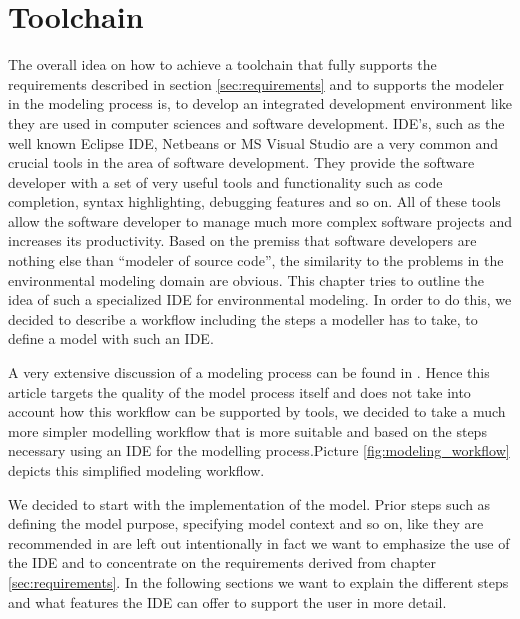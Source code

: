 \chapter{Toolchain} \label{chap:toolchain}

The overall idea on how to achieve a toolchain that fully supports the requirements described in section \ref{sec:requirements} and to supports the modeler in the modeling process is, to develop an integrated development environment like they are used in computer sciences and software development. IDE’s, such as the well known Eclipse IDE, Netbeans or MS Visual Studio  are a very common and crucial tools in the area of software development. They provide the software developer with a set of very useful tools and functionality such as code completion, syntax highlighting, debugging features and so on. All of these tools allow the software developer to manage much more complex software projects and increases its productivity. Based on the premiss that software developers are nothing else than “modeler of source code”, the similarity to the problems in the environmental modeling domain are obvious. This chapter tries to outline the idea of such a specialized IDE for environmental modeling. In order to do this, we decided to describe a workflow including the steps a modeller has to take, to define a model with such an IDE.


A very extensive discussion of a modeling process can be found in \autocite{Jakeman2006602}. Hence this article targets the quality of the model process itself and does not take into account how this workflow can be supported by tools, we decided to take a much more simpler modelling workflow that is more suitable and based on the steps necessary using an IDE for the modelling process.Picture \ref{fig:modeling_workflow} depicts this simplified modeling workflow.


We decided to start with the implementation of the model. Prior steps such as defining the model purpose, specifying model context and so on, like they are recommended in \autocite{Jakeman2006602} are left out intentionally in fact we want to emphasize the use of the IDE and to concentrate on the requirements derived from chapter \ref{sec:requirements}. In the following sections we want to explain the different steps and what features the IDE can offer to support the user in more detail. 


